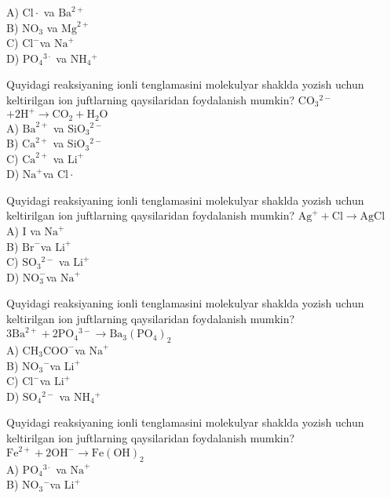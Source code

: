 A) $\mathrm{Cl} \cdot$ va $\mathrm{Ba}^{2+}$\\
B) $\mathrm{NO}_{3}$ va $\mathrm{Mg}^{2+}$\\
C) $\mathrm{Cl}^{-}$va $\mathrm{Na}^{+}$\\
D) $\mathrm{PO}_{4}{ }^{3 \cdot}$ va $\mathrm{NH}_{4}{ }^{+}$
  \item Quyidagi reaksiyaning ionli tenglamasini molekulyar shaklda yozish uchun keltirilgan ion juftlarning qaysilaridan foydalanish mumkin? $\mathrm{CO}_{3}{ }^{2-}$ $+2 \mathrm{H}^{+} \rightarrow \mathrm{CO}_{2}+\mathrm{H}_{2} \mathrm{O}$\\
A) $\mathrm{Ba}^{2+}$ va $\mathrm{SiO}_{3}{ }^{2-}$\\
B) $\mathrm{Ca}^{2+}$ va $\mathrm{SiO}_{3}{ }^{2-}$\\
C) $\mathrm{Ca}^{2+}$ va $\mathrm{Li}^{+}$\\
D) $\mathrm{Na}^{+}$va $\mathrm{Cl} \cdot$
  \item Quyidagi reaksiyaning ionli tenglamasini molekulyar shaklda yozish uchun keltirilgan ion juftlarning qaysilaridan foydalanish mumkin? $\mathrm{Ag}^{+}+\mathrm{Cl} \rightarrow \mathrm{AgCl}$\\
A) I va $\mathrm{Na}^{+}$\\
B) $\mathrm{Br}^{-}$va $\mathrm{Li}^{+}$\\
C) $\mathrm{SO}_{3}{ }^{2-}$ va $\mathrm{Li}^{+}$\\
D) $\mathrm{NO}_{3}^{-}$va $\mathrm{Na}^{+}$
  \item Quyidagi reaksiyaning ionli tenglamasini molekulyar shaklda yozish uchun keltirilgan ion juftlarning qaysilaridan foydalanish mumkin? $3 \mathrm{Ba}^{2+}+2 \mathrm{PO}_{4}{ }^{3-} \rightarrow \mathrm{Ba}_{3}\left(\mathrm{PO}_{4}\right)_{2}$\\
A) $\mathrm{CH}_{3} \mathrm{COO}^{-}$va $\mathrm{Na}^{+}$\\
B) $\mathrm{NO}_{3}{ }^{-}$va $\mathrm{Li}^{+}$\\
C) $\mathrm{Cl}^{-}$va $\mathrm{Li}^{+}$\\
D) $\mathrm{SO}_{4}{ }^{2-}$ va $\mathrm{NH}_{4}{ }^{+}$
  \item Quyidagi reaksiyaning ionli tenglamasini molekulyar shaklda yozish uchun keltirilgan ion juftlarning qaysilaridan foydalanish mumkin? $\mathrm{Fe}^{2+}+2 \mathrm{OH}^{-} \rightarrow \mathrm{Fe}(\mathrm{OH})_{2}$\\
A) $\mathrm{PO}_{4}{ }^{3 \cdot}$ va $\mathrm{Na}^{+}$\\
B) $\mathrm{NO}_{3}{ }^{-}$va $\mathrm{Li}^{+}$\\
